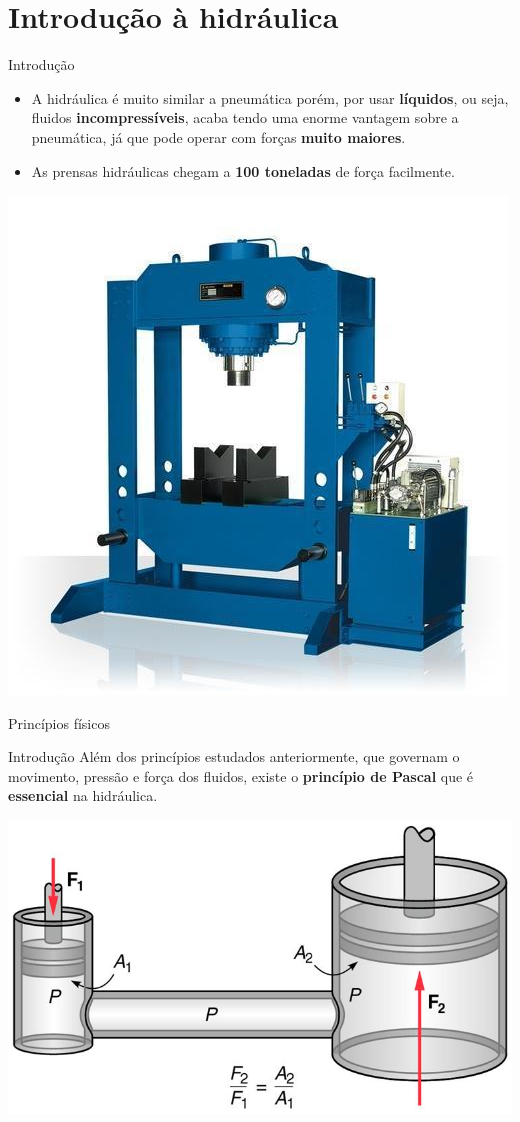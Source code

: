 \section{Introdução à hidráulica}

\begin{frame}{Introdução}
	\begin{block}{}
		\begin{itemize}
			\item A hidráulica é muito similar a pneumática porém, por usar \textbf{líquidos}, ou seja, fluidos \textbf{incompressíveis}, acaba tendo uma enorme vantagem sobre a pneumática, já que pode operar com forças \textbf{muito maiores}.
			\item As prensas hidráulicas chegam a \textbf{100 toneladas} de força facilmente.
		\end{itemize}
	\end{block}
	
	\centering
	\includegraphics[width=0.45\linewidth]{Figuras/Ch15/fig1}

\end{frame}


\begin{frame}{Princípios físicos}
	\begin{block}{Introdução}
		Além dos princípios estudados anteriormente, que governam o movimento, pressão e força dos fluidos, existe o \textbf{princípio de Pascal} que é \textbf{essencial }na hidráulica.
	\end{block}

	\medskip
	
	\centering
	\includegraphics[width=0.7\linewidth]{Figuras/Ch15/fig6}
	
\end{frame}


